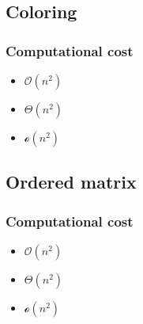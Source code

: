 \documentclass{article}
\begin{document}
\subsection{Coloring}
\subsubsection{Computational cost}
\begin{itemize}
    \item $\mathcal{O}(n^{2})$
    \item $\Theta(n^{2})$
    \item $\mathcal{o}(n^{2})$
\end{itemize}

\subsection{Ordered matrix}
\subsubsection{Computational cost}
\begin{itemize}
    \item $\mathcal{O}(n^{2})$
    \item $\Theta(n^{2})$
    \item $\mathcal{o}(n^{2})$
\end{itemize}
\end{document}
